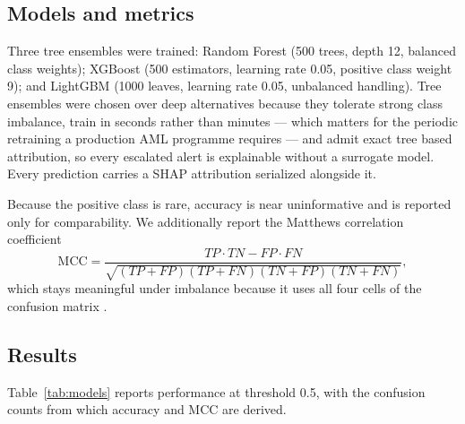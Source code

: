 \documentclass[conference]{IEEEtran}
\begin{document}
\subsection{Models and metrics}

Three tree ensembles were trained: Random Forest \cite{breiman2001randomforest}
(500 trees, depth 12, balanced class weights); XGBoost \cite{chen2016xgboost}
(500 estimators, learning rate 0.05, positive class weight 9); and LightGBM
\cite{ke2017lightgbm} (1000 leaves, learning rate 0.05, unbalanced handling).
Tree ensembles were chosen over deep alternatives because they tolerate strong
class imbalance, train in seconds rather than minutes --- which matters for the
periodic retraining a production AML programme requires --- and admit exact tree
based attribution, so every escalated alert is explainable without a surrogate
model. Every prediction carries a SHAP attribution \cite{lundberg2017shap}
serialized alongside it.

Because the positive class is rare, accuracy is near uninformative and is
reported only for comparability. We additionally report the Matthews correlation
coefficient
\begin{equation}
\mathrm{MCC} = \frac{TP \cdot TN - FP \cdot FN}
{\sqrt{(TP{+}FP)(TP{+}FN)(TN{+}FP)(TN{+}FN)}},
\label{eq:mcc}
\end{equation}
which stays meaningful under imbalance because it uses all four cells of the
confusion matrix \cite{chicco2020mcc}.

\subsection{Results}

Table~\ref{tab:models} reports performance at threshold 0.5, with the confusion
counts from which accuracy and MCC are derived.
\end{document}
